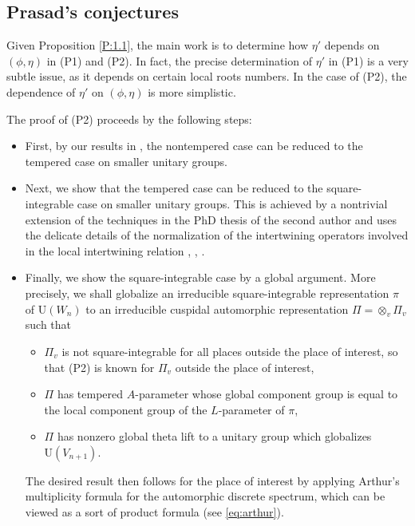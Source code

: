 \documentclass[11pt]{amsart}
\numberwithin{equation}{section}
\theoremstyle{plain}
\theoremstyle{definition}
\theoremstyle{remark}
\def\U{\mathrm{U}}
\begin{document}
\subsection{Prasad's conjectures}

Given Proposition \ref{P:1.1}, the main work is to determine how $\eta'$ depends on $(\phi, \eta)$ in (P1) and (P2). In fact, the precise determination of $\eta'$ in (P1) is a very subtle issue, as it depends on certain local roots numbers.
In the case of (P2), the dependence of $\eta'$ on $(\phi,\eta)$ is more simplistic. 

The proof of (P2) proceeds by the following steps:

\begin{itemize}

\item First, by our results in \cite{gi}, the nontempered case can be reduced to the tempered case on smaller unitary groups.

\item Next, we show that the tempered case can be reduced to the square-integrable case on smaller unitary groups. This is achieved by a nontrivial extension of  the techniques in the PhD thesis of the second author \cite{i} and uses the delicate details of the normalization of the intertwining operators involved in the local intertwining relation \cite{a}, \cite{mok}, \cite{kmsw}.

\item Finally, we show the square-integrable case by a global argument. More precisely, we shall globalize an irreducible square-integrable representation $\pi$ of $\U(W_n)$ to an irreducible cuspidal automorphic representation $\Pi = \otimes_v \Pi_v$ such that

\begin{itemize}

\item $\Pi_v$ is not square-integrable for all places outside the place of interest, so that (P2) is known for $\Pi_v$ outside the place of interest,

\item $\Pi$ has tempered $A$-parameter whose global component group is equal to  the local component group of the $L$-parameter of $\pi$,

\item $\Pi$ has nonzero global theta lift to a unitary group which globalizes $\U(V_{n+1})$.
 
\end{itemize}
The desired result then follows for the place of interest by applying Arthur's multiplicity formula for the automorphic discrete spectrum, which can be viewed as a sort of product formula (see \eqref{eq:arthur}).
\end{itemize}
\end{document}
